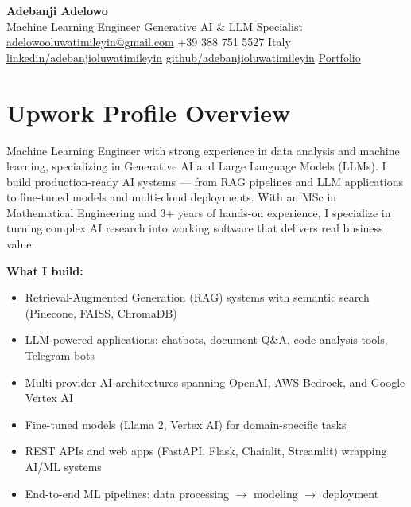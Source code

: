 \documentclass[11pt,a4paper]{article}
\begin{document}
\begin{center}
  {\LARGE\bfseries\color{VividPurple} Adebanji Adelowo}\\[4pt]
  {\large Machine Learning Engineer \textbar{} Generative AI \& LLM Specialist}\\[6pt]
  \small
  \href{mailto:adelowooluwatimileyin@gmail.com}{adelowooluwatimileyin@gmail.com} \quad
  +39 388 751 5527 \quad
  Italy \\[2pt]
  \href{https://linkedin.com/in/adebanjioluwatimileyin}{linkedin/adebanjioluwatimileyin} \quad
  \href{https://github.com/adebanjioluwatimileyin}{github/adebanjioluwatimileyin} \quad
  \href{https://adebanjioluwatimileyin.github.io/}{Portfolio}
\end{center}

\vspace{4pt}

\section{Upwork Profile Overview}

Machine Learning Engineer with strong experience in data analysis and machine learning, specializing in Generative AI and Large Language Models (LLMs). I build production-ready AI systems --- from RAG pipelines and LLM applications to fine-tuned models and multi-cloud deployments. With an MSc in Mathematical Engineering and 3+ years of hands-on experience, I specialize in turning complex AI research into working software that delivers real business value.

\textbf{\textcolor{VividPurple}{What I build:}}
\begin{itemize}
  \item Retrieval-Augmented Generation (RAG) systems with semantic search (Pinecone, FAISS, ChromaDB)
  \item LLM-powered applications: chatbots, document Q\&A, code analysis tools, Telegram bots
  \item Multi-provider AI architectures spanning OpenAI, AWS Bedrock, and Google Vertex AI
  \item Fine-tuned models (Llama 2, Vertex AI) for domain-specific tasks
  \item REST APIs and web apps (FastAPI, Flask, Chainlit, Streamlit) wrapping AI/ML systems
  \item End-to-end ML pipelines: data processing $\rightarrow$ modeling $\rightarrow$ deployment
\end{itemize}
\end{document}
